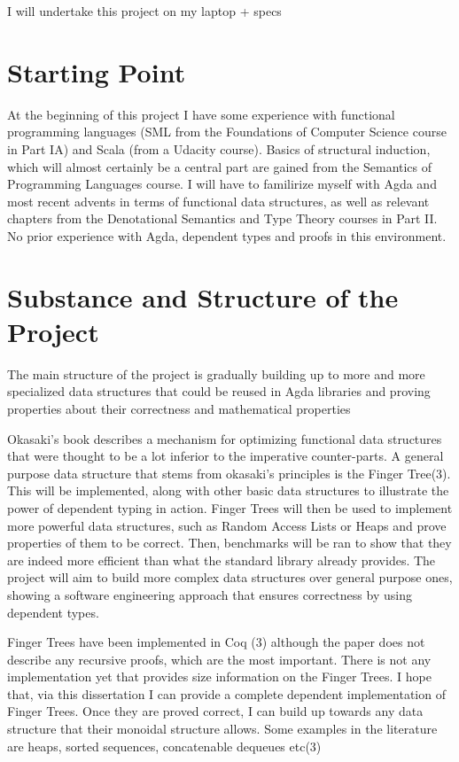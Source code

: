 \documentclass[12pt]{article}
\begin{document}
I will undertake this project on my laptop + specs

\section*{Starting Point}

At the beginning of this project I have some experience with functional programming
languages (SML from the Foundations of Computer Science course in Part IA) and Scala
(from a Udacity course). Basics of structural induction, which will almost certainly
be a central part are gained from the Semantics of Programming Languages course.
I will have to familirize myself with Agda and most recent advents in terms of
functional data structures, as well as relevant chapters from the
Denotational Semantics and Type Theory courses in Part II.
No prior experience with Agda, dependent types and proofs in this environment.

\section*{Substance and Structure of the Project}

The main structure of the project is gradually building up to more and more
specialized data structures that could be reused in Agda libraries and proving
properties about their correctness and mathematical properties

Okasaki's book describes a mechanism for optimizing functional data structures
that were thought to be a lot inferior to the imperative counter-parts.
A general purpose data structure that stems from okasaki's principles is the
Finger Tree(3). This will be implemented, along with other basic data structures to
illustrate the power of dependent typing in action. Finger Trees will then be used
to implement more powerful data structures, such as Random Access Lists or
Heaps and prove properties of them to be correct. Then, benchmarks will be ran to
show that they are indeed more efficient than what the standard library already provides.
The project will aim to build more complex data structures over general
purpose ones, showing a software engineering approach that ensures correctness
by using dependent types.

Finger Trees have been implemented in Coq (3) although the paper does not describe
any recursive proofs, which are the most important. There is not any implementation
yet that provides size information on the Finger Trees. I hope that, via this
dissertation I can provide a complete dependent implementation of Finger Trees.
Once they are proved correct, I can build up towards any data structure that
their monoidal structure allows. Some examples in the literature are heaps,
sorted sequences, concatenable dequeues etc(3)
\end{document}
